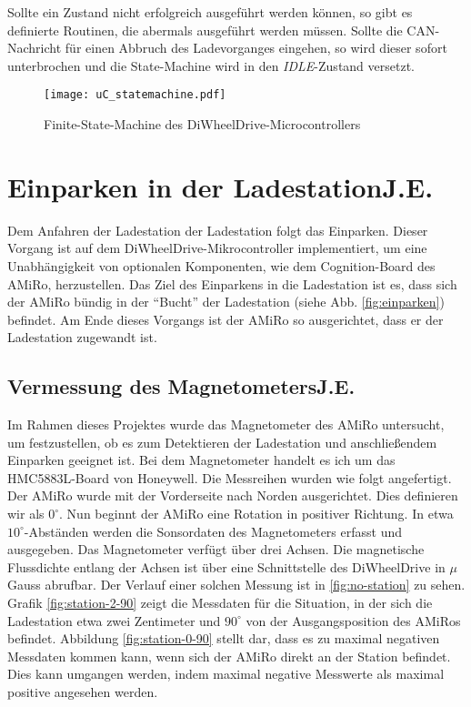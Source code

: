 Sollte ein Zustand nicht erfolgreich ausgeführt werden können, so gibt es definierte Routinen, die abermals ausgeführt werden müssen. Sollte die CAN-Nachricht für einen Abbruch des Ladevorganges eingehen, so wird dieser sofort unterbrochen und die State-Machine wird in den \textit{IDLE}-Zustand versetzt.

\begin{figure}[h]
	\begin{center}
		\texttt{[image: uC\_statemachine.pdf]} 	
		\caption{Finite-State-Machine des DiWheelDrive-Microcontrollers}
		\label{fig:uC_statmachine}
	\end{center}
\end{figure}

\section[Einparken in der Ladestation]{Einparken in der Ladestation\hfill {\normalsize J.E.}}\label{kap:einparken_ladestation} %
Dem Anfahren der Ladestation der Ladestation folgt das Einparken. Dieser Vorgang ist auf dem DiWheelDrive-Mikrocontroller implementiert, um eine Unabhängigkeit von optionalen Komponenten, wie dem Cognition-Board des AMiRo, herzustellen. Das Ziel des Einparkens in die Ladestation ist es, dass sich der AMiRo bündig in der ``Bucht'' der Ladestation (siehe Abb. \ref{fig:einparken}) befindet. Am Ende dieses Vorgangs ist der AMiRo so ausgerichtet, dass er der Ladestation zugewandt ist.

\subsection[Vermessung des Magnetometers]{Vermessung des Magnetometers\hfill {\normalsize J.E.}}
Im Rahmen dieses Projektes wurde das Magnetometer des AMiRo untersucht, um festzustellen, ob es zum Detektieren der Ladestation und anschließendem Einparken geeignet ist.
Bei dem Magnetometer handelt es ich um das HMC5883L-Board von Honeywell.
Die Messreihen wurden wie folgt angefertigt. Der AMiRo wurde mit der Vorderseite nach Norden ausgerichtet. Dies definieren wir als $0^\circ$. Nun beginnt der AMiRo eine Rotation in positiver Richtung. In etwa $10^\circ$-Abständen werden die Sonsordaten des Magnetometers erfasst und ausgegeben. Das Magnetometer verfügt über drei Achsen. Die magnetische Flussdichte entlang der Achsen ist über eine Schnittstelle des DiWheelDrive in $\mu$Gauss abrufbar. Der Verlauf einer solchen Messung ist in \ref{fig:no-station} zu sehen.
Grafik \ref{fig:station-2-90} zeigt die Messdaten für die Situation, in der sich die Ladestation etwa zwei Zentimeter und $90^\circ$ von der Ausgangsposition des AMiRos befindet.
Abbildung \ref{fig:station-0-90} stellt dar, dass es zu maximal negativen Messdaten kommen kann, wenn sich der AMiRo direkt an der Station befindet. Dies kann umgangen werden, indem maximal negative Messwerte als maximal positive angesehen werden.

